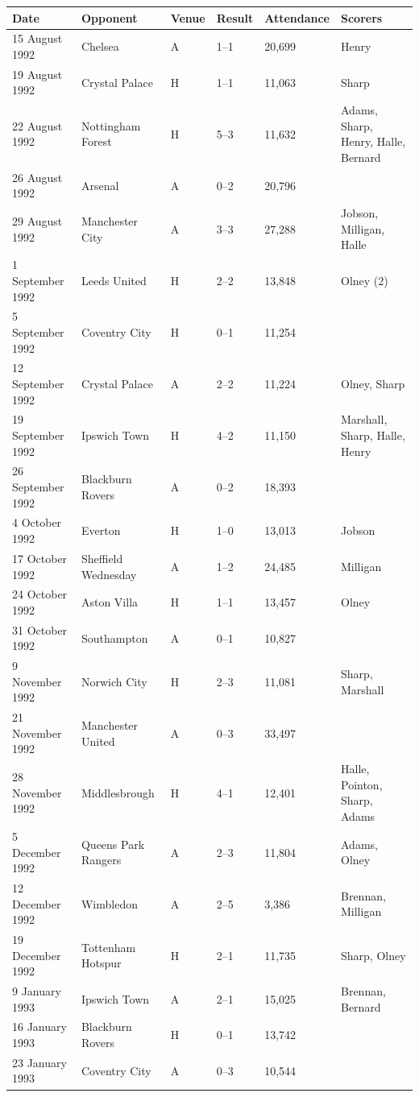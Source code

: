 \documentclass{article}
\begin{document}
\begin{tabular}{llllll}
\toprule
Date & Opponent & Venue & Result & Attendance & Scorers \\
\midrule
15 August 1992 & Chelsea & A & 1–1 & 20,699 & Henry \\
19 August 1992 & Crystal Palace & H & 1–1 & 11,063 & Sharp \\
22 August 1992 & Nottingham Forest & H & 5–3 & 11,632 & Adams, Sharp, Henry, Halle, Bernard \\
26 August 1992 & Arsenal & A & 0–2 & 20,796 &  \\
29 August 1992 & Manchester City & A & 3–3 & 27,288 & Jobson, Milligan, Halle \\
1 September 1992 & Leeds United & H & 2–2 & 13,848 & Olney (2) \\
5 September 1992 & Coventry City & H & 0–1 & 11,254 &  \\
12 September 1992 & Crystal Palace & A & 2–2 & 11,224 & Olney, Sharp \\
19 September 1992 & Ipswich Town & H & 4–2 & 11,150 & Marshall, Sharp, Halle, Henry \\
26 September 1992 & Blackburn Rovers & A & 0–2 & 18,393 &  \\
4 October 1992 & Everton & H & 1–0 & 13,013 & Jobson \\
17 October 1992 & Sheffield Wednesday & A & 1–2 & 24,485 & Milligan \\
24 October 1992 & Aston Villa & H & 1–1 & 13,457 & Olney \\
31 October 1992 & Southampton & A & 0–1 & 10,827 &  \\
9 November 1992 & Norwich City & H & 2–3 & 11,081 & Sharp, Marshall \\
21 November 1992 & Manchester United & A & 0–3 & 33,497 &  \\
28 November 1992 & Middlesbrough & H & 4–1 & 12,401 & Halle, Pointon, Sharp, Adams \\
5 December 1992 & Queens Park Rangers & A & 2–3 & 11,804 & Adams, Olney \\
12 December 1992 & Wimbledon & A & 2–5 & 3,386 & Brennan, Milligan \\
19 December 1992 & Tottenham Hotspur & H & 2–1 & 11,735 & Sharp, Olney \\
9 January 1993 & Ipswich Town & A & 2–1 & 15,025 & Brennan, Bernard \\
16 January 1993 & Blackburn Rovers & H & 0–1 & 13,742 &  \\
23 January 1993 & Coventry City & A & 0–3 & 10,544 &  \\

\end{tabular}
\end{document}
